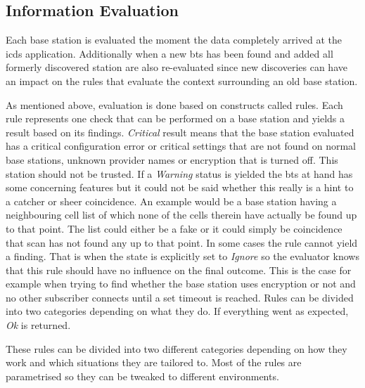 \subsection{Information Evaluation}
\label{sec:info_evaluation}
Each base station is evaluated the moment the data completely arrived at the \gls{icds} application.
Additionally when a new \gls{bts} has been found and added all formerly discovered station are also re-evaluated since new discoveries can have an impact on the rules that evaluate the context surrounding an old base station.

As mentioned above, evaluation is done based on constructs called rules.
Each rule represents one check that can be performed on a base station and yields a result based on its findings.
\emph{Critical} result means that the base station evaluated has a critical configuration error or critical settings that are not found on normal base stations, \eg unknown provider names or encryption that is turned off.
This station should not be trusted.
If  a \emph{Warning} status is yielded the \gls{bts} at hand has some concerning features but it could not be said whether this really is a hint to a catcher or sheer coincidence.
An example would be a base station having a  neighbouring cell list of which none of the cells therein have actually be found up to that point.
The list could either be a fake or it could simply be coincidence that scan has not found any up to that point.
In some cases the rule cannot yield a finding.
That is when the state is explicitly set to \emph{Ignore} so the evaluator knows that this rule should have no influence on the final outcome.	
This is the case for example when trying to find whether the base station uses encryption or not and no other subscriber connects until a set timeout is reached.
Rules can be divided into two categories depending on what they do.
If everything went as expected, \emph{Ok} is returned.

These rules can be divided into two different categories depending on how they work and which situations they are tailored to.
Most of the rules are parametrised so they can be tweaked to different environments.

